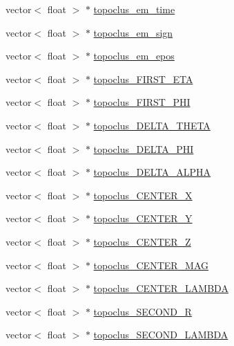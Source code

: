 \begin{DoxyCompactItemize}
vector$<$ float $>$ $\ast$ \hyperlink{classCollectionTree_a5f5a09f4a4f34a12ee216ab3892602ea}{topoclus\+\_\+em\+\_\+time}
\item 
vector$<$ float $>$ $\ast$ \hyperlink{classCollectionTree_a5fee54ab24ad35271627a580738cba0c}{topoclus\+\_\+em\+\_\+sign}
\item 
vector$<$ float $>$ $\ast$ \hyperlink{classCollectionTree_a8bf0b08e6e77f264d0518d6d5cb8e65a}{topoclus\+\_\+em\+\_\+epos}
\item 
vector$<$ float $>$ $\ast$ \hyperlink{classCollectionTree_ac096496e00e0c6ebf7ae10095b4ae314}{topoclus\+\_\+\+F\+I\+R\+S\+T\+\_\+\+E\+TA}
\item 
vector$<$ float $>$ $\ast$ \hyperlink{classCollectionTree_aa95038158ec0ce8e947b4cd40a8bc713}{topoclus\+\_\+\+F\+I\+R\+S\+T\+\_\+\+P\+HI}
\item 
vector$<$ float $>$ $\ast$ \hyperlink{classCollectionTree_ad8b6b1d1a2e7e68abb9e40efa3b8d328}{topoclus\+\_\+\+D\+E\+L\+T\+A\+\_\+\+T\+H\+E\+TA}
\item 
vector$<$ float $>$ $\ast$ \hyperlink{classCollectionTree_a01d845882d881824933e9118eff03ab3}{topoclus\+\_\+\+D\+E\+L\+T\+A\+\_\+\+P\+HI}
\item 
vector$<$ float $>$ $\ast$ \hyperlink{classCollectionTree_abce46d633d2bb3d11f35faf8c039c5d8}{topoclus\+\_\+\+D\+E\+L\+T\+A\+\_\+\+A\+L\+P\+HA}
\item 
vector$<$ float $>$ $\ast$ \hyperlink{classCollectionTree_a820c0609f5c0bae3c6a7f7d887a19a97}{topoclus\+\_\+\+C\+E\+N\+T\+E\+R\+\_\+X}
\item 
vector$<$ float $>$ $\ast$ \hyperlink{classCollectionTree_aed4d10873b4e79ef6c1e991e57b93185}{topoclus\+\_\+\+C\+E\+N\+T\+E\+R\+\_\+Y}
\item 
vector$<$ float $>$ $\ast$ \hyperlink{classCollectionTree_a32938d9fc7581d6c0aca1b01844a22ee}{topoclus\+\_\+\+C\+E\+N\+T\+E\+R\+\_\+Z}
\item 
vector$<$ float $>$ $\ast$ \hyperlink{classCollectionTree_a289fb059cd5780a342dd20d833334092}{topoclus\+\_\+\+C\+E\+N\+T\+E\+R\+\_\+\+M\+AG}
\item 
vector$<$ float $>$ $\ast$ \hyperlink{classCollectionTree_a8e71d800cd37acd42755dc48af4a81ec}{topoclus\+\_\+\+C\+E\+N\+T\+E\+R\+\_\+\+L\+A\+M\+B\+DA}
\item 
vector$<$ float $>$ $\ast$ \hyperlink{classCollectionTree_a7072aeb9f78bcb62c14e8e9add7c0dd0}{topoclus\+\_\+\+S\+E\+C\+O\+N\+D\+\_\+R}
\item 
vector$<$ float $>$ $\ast$ \hyperlink{classCollectionTree_af902666d681a1184574287aa6d891a6f}{topoclus\+\_\+\+S\+E\+C\+O\+N\+D\+\_\+\+L\+A\+M\+B\+DA}

\end{DoxyCompactItemize}
